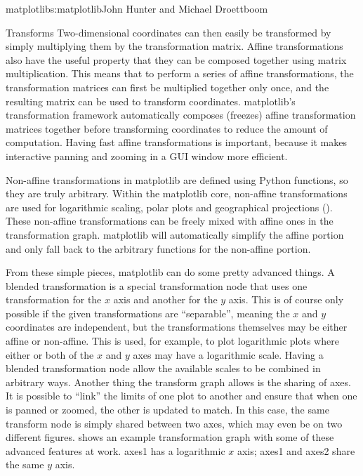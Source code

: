 \begin{aosachapter}{matplotlib}{s:matplotlib}{John Hunter and Michael Droettboom}
\begin{aosasect1}{Transforms}
Two-dimensional coordinates can then easily be transformed by simply
multiplying them by the transformation matrix.  Affine transformations
also have the useful property that they can be composed together using
matrix multiplication.  This means that to perform a series of affine
transformations, the transformation matrices can first be multiplied
together only once, and the resulting matrix can be used to transform
coordinates.  matplotlib's transformation framework automatically
composes (freezes) affine transformation matrices together before
transforming coordinates to reduce the amount of computation.  Having
fast affine transformations is important, because it makes interactive
panning and zooming in a GUI window more efficient.


Non-affine transformations in matplotlib are defined using Python
functions, so they are truly arbitrary.  Within the matplotlib core,
non-affine transformations are used for logarithmic scaling, polar
plots and geographical projections ().
These non-affine transformations can be freely mixed with affine ones
in the transformation graph.  matplotlib will automatically simplify
the affine portion and only fall back to the arbitrary functions for
the non-affine portion.

From these simple pieces, matplotlib can do some pretty advanced
things.  A blended transformation is a special transformation node
that uses one transformation for the $x$ axis and another for the $y$
axis.  This is of course only possible if the given transformations
are ``separable'', meaning the $x$ and $y$ coordinates are
independent, but the transformations themselves may be either affine
or non-affine.  This is used, for example, to plot logarithmic plots
where either or both of the $x$ and $y$ axes may have a logarithmic
scale.  Having a blended transformation node allow the available
scales to be combined in arbitrary ways.  Another thing the transform
graph allows is the sharing of axes.  It is possible to ``link'' the
limits of one plot to another and ensure that when one is panned or
zoomed, the other is updated to match.  In this case, the same
transform node is simply shared between two axes, which may even be on
two different figures.  
shows an example transformation graph with some of these advanced
features at work.  axes1 has a logarithmic $x$ axis;  axes1 and axes2
share the same $y$ axis.


\end{aosasect1}
\end{aosachapter}
